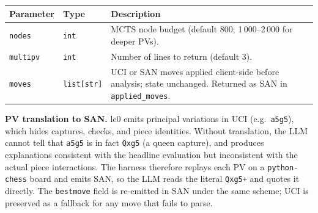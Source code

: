 \begin{tcolorbox}[toolbox,
  title={\texttt{analyze(nodes: int = 800, multipv: int = 3, moves: list[str] = [])}}]

\smallskip
\begin{tabular}{@{}lp{1.8cm}p{7.2cm}@{}}
  \toprule
  \textbf{Parameter} & \textbf{Type} & \textbf{Description} \\
  \midrule
  \texttt{nodes}   & \texttt{int}       & MCTS node budget (default 800; 1\,000--2\,000 for deeper PVs). \\
  \texttt{multipv} & \texttt{int}       & Number of lines to return (default 3). \\
  \texttt{moves}   & \texttt{list[str]} & UCI or SAN moves applied client-side before analysis; state unchanged.  Returned as SAN in \texttt{applied\_moves}. \\
  \bottomrule
\end{tabular}

\smallskip
{}

\smallskip
\noindent\textbf{PV translation to SAN.}  lc0 emits principal variations
in UCI (e.g.\ \texttt{a5g5}), which hides captures, checks, and piece
identities.  Without translation, the LLM cannot tell that \texttt{a5g5}
is in fact \texttt{Qxg5} (a queen capture), and produces explanations
consistent with the headline evaluation but inconsistent with the actual
piece interactions.  The harness therefore replays each PV on a
\texttt{python-chess} board and emits SAN, so the LLM reads the
literal \texttt{Qxg5+} and quotes it directly.  The \texttt{bestmove}
field is re-emitted in SAN under the same scheme; UCI is preserved as a
fallback for any move that fails to parse.
\end{tcolorbox}

